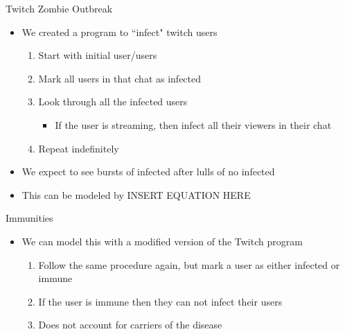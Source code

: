 \documentclass{beamer}
\begin{document}
\begin{frame}{Twitch Zombie Outbreak}
\begin{itemize}
\item We created a program to ``infect" twitch users
\pause
\begin{enumerate}
\item Start with initial user/users
\pause
\item Mark all users in that chat as infected
\pause
\item Look through all the infected users
\pause
\begin{itemize}
\item If the user is streaming, then infect all their viewers in their chat
\end{itemize}
\pause
\item Repeat indefinitely
\end{enumerate}
\pause
\item We expect to see bursts of infected after lulls of no infected
\pause
\item This can be modeled by INSERT EQUATION HERE
\[
\]
\end{itemize}
\end{frame}

\begin{frame}{Immunities}
\begin{itemize}
\item We can model this with a modified version of the Twitch program
\pause
\begin{enumerate}
\item Follow the same procedure again, but mark a user as either infected or immune
\pause
\item If the user is immune then they can not infect their users
\pause
\item Does not account for carriers of the disease
\end{enumerate}
\end{itemize}
\end{frame}

\end{document}
